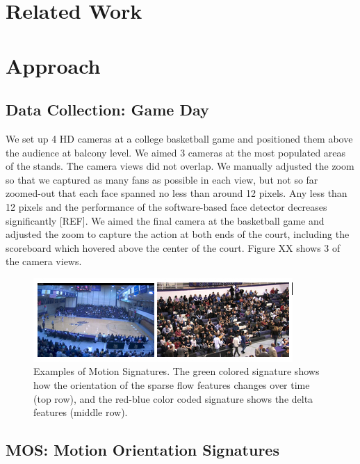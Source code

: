 \documentclass[times, 10pt,twocolumn]{article}
\begin{document}
\section{Related Work}
\label{sec_related}
\section{Approach}

\subsection{Data Collection: Game Day}
\label{sec_GameDay}

We set up 4 HD cameras at a college basketball game and positioned them above the audience at balcony level.  We aimed 3 cameras at the most populated areas of the stands.  The camera views did not overlap.  We manually adjusted the zoom so that we captured as many fans as possible in each view, but not so far zoomed-out that each face spanned no less than around 12 pixels.  Any less than 12 pixels and the performance of the software-based face detector decreases significantly [REF].  We aimed the final camera at the basketball game and adjusted the zoom to capture the action at both ends of the court, including the scoreboard which hovered above the center of the court.  Figure XX shows 3 of the camera views.

\begin{figure}[bt]
\centering
\includegraphics[width=0.46\columnwidth]{cams}
\caption{\label{fig_example_mos} \small Examples of Motion Signatures.  The green colored signature shows how the orientation of the sparse flow features changes over time (top row), and the red-blue color coded signature shows the delta features (middle row).}
\end{figure}

\subsection{MOS: Motion Orientation Signatures}
\label{sec_MOS}
\end{document}
